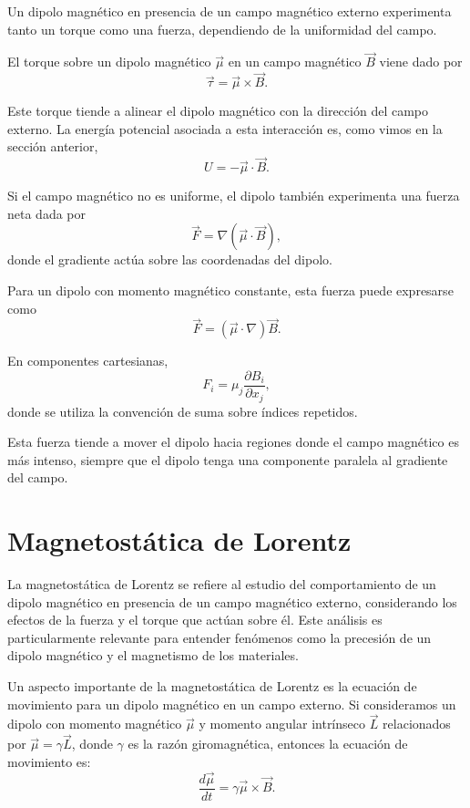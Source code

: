 \documentclass[12pt,a4paper]{book}
\begin{document}
Un dipolo magnético en presencia de un campo magnético externo experimenta tanto un torque como una fuerza, dependiendo de la uniformidad del campo.

El torque sobre un dipolo magnético $\vec{\mu}$ en un campo magnético $\vec{B}$ viene dado por
\begin{equation}
\vec{\tau} = \vec{\mu} \times \vec{B}.
\end{equation}

Este torque tiende a alinear el dipolo magnético con la dirección del campo externo. La energía potencial asociada a esta interacción es, como vimos en la sección anterior,
\begin{equation}
U = -\vec{\mu} \cdot \vec{B}.
\end{equation}

Si el campo magnético no es uniforme, el dipolo también experimenta una fuerza neta dada por
\begin{equation}
\vec{F} = \nabla(\vec{\mu} \cdot \vec{B}),
\end{equation}
donde el gradiente actúa sobre las coordenadas del dipolo.

Para un dipolo con momento magnético constante, esta fuerza puede expresarse como
\begin{equation}
\vec{F} = (\vec{\mu} \cdot \nabla) \vec{B}.
\end{equation}

En componentes cartesianas,
\begin{equation}
F_i = \mu_j \frac{\partial B_i}{\partial x_j},
\end{equation}
donde se utiliza la convención de suma sobre índices repetidos.

Esta fuerza tiende a mover el dipolo hacia regiones donde el campo magnético es más intenso, siempre que el dipolo tenga una componente paralela al gradiente del campo.

\section{Magnetostática de Lorentz}

La magnetostática de Lorentz se refiere al estudio del comportamiento de un dipolo magnético en presencia de un campo magnético externo, considerando los efectos de la fuerza y el torque que actúan sobre él. Este análisis es particularmente relevante para entender fenómenos como la precesión de un dipolo magnético y el magnetismo de los materiales.

Un aspecto importante de la magnetostática de Lorentz es la ecuación de movimiento para un dipolo magnético en un campo externo. Si consideramos un dipolo con momento magnético $\vec{\mu}$ y momento angular intrínseco $\vec{L}$ relacionados por $\vec{\mu} = \gamma \vec{L}$, donde $\gamma$ es la razón giromagnética, entonces la ecuación de movimiento es:
\begin{equation}
\frac{d\vec{\mu}}{dt} = \gamma \vec{\mu} \times \vec{B}.
\end{equation}
\end{document}

